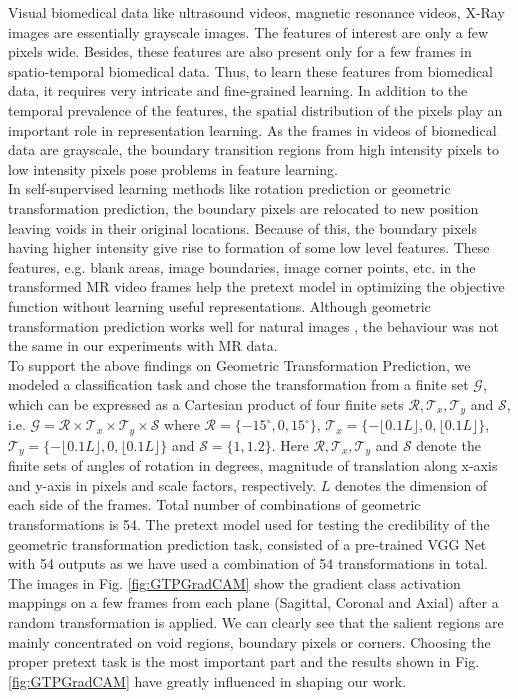 \documentclass[journal]{IEEEtai}
\begin{document}
\indent Visual biomedical data like ultrasound videos, magnetic resonance videos, X-Ray images are essentially grayscale images. The features of interest are only a few pixels wide. Besides, these features are also present only for a few frames in spatio-temporal biomedical data. Thus, to learn these features from biomedical data, it requires very intricate and fine-grained learning. In addition to the temporal prevalence of the features, the spatial distribution of the pixels play an important role in representation learning. As the frames in videos of biomedical data are grayscale, the boundary transition regions from high intensity pixels to low intensity pixels pose problems in feature learning.\\
\indent In self-supervised learning methods like rotation prediction or geometric transformation prediction, the boundary pixels are relocated to new position leaving voids in their original locations. Because of this, the boundary pixels having higher intensity give rise to formation of some low level features. These features, e.g. blank areas, image boundaries, image corner points, etc. in the transformed MR video frames help the pretext model in optimizing the objective function without learning useful representations. Although geometric transformation prediction works well for natural images \cite{rotnet,videorotnet}, the behaviour was not the same in our experiments with MR data.\\
\indent To support the above findings on Geometric Transformation Prediction, we modeled a classification task and chose the transformation from a finite set $\mathcal{G}$, which can be expressed as a Cartesian product of four finite sets $\mathcal{R},\mathcal{T}_x,\mathcal{T}_y$ and $\mathcal{S}$, i.e. $\mathcal{G} = \mathcal{R} \times \mathcal{T}_x \times \mathcal{T}_y \times \mathcal{S}$ where $\mathcal{R} =\{-15^{\circ}, 0, 15^{\circ}\}$, $\mathcal{T}_x = \{-\lfloor0.1 L \rfloor,0,\lfloor0.1 L \rfloor\}$, $\mathcal{T}_y = \{-\lfloor0.1 L \rfloor,0,\lfloor0.1 L \rfloor\}$ and $\mathcal{S} = \{1,1.2\}$. Here $\mathcal{R},\mathcal{T}_x,\mathcal{T}_y$ and $\mathcal{S}$ denote the finite sets of angles of rotation in degrees, magnitude of translation along x-axis and y-axis in pixels and scale factors, respectively. $L$ denotes the dimension of each side of the frames. Total number of combinations of geometric transformations is 54. The pretext model used for testing the credibility of the geometric transformation prediction task, consisted of a pre-trained VGG Net with 54 outputs as we have used a combination of 54 transformations in total. The images in Fig. \ref{fig:GTPGradCAM} show the gradient class activation mappings \cite{gradcam} on a few frames from each plane (Sagittal, Coronal and Axial) after a random transformation is applied. We can clearly see that the salient regions are mainly concentrated on void regions, boundary pixels or corners. Choosing the proper pretext task is the most important part and the results shown in Fig. \ref{fig:GTPGradCAM} have greatly influenced in shaping our work.
\end{document}

